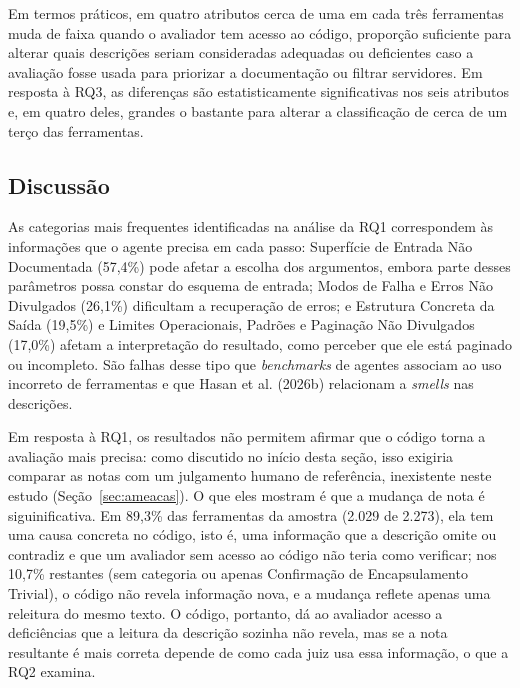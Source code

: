 Em termos práticos, em quatro atributos cerca de uma em cada três ferramentas muda de faixa quando o avaliador tem acesso ao código, proporção suficiente para alterar quais descrições seriam consideradas adequadas ou deficientes caso a avaliação fosse usada para priorizar a documentação ou filtrar servidores. Em resposta à RQ3, as diferenças são estatisticamente significativas nos seis atributos e, em quatro deles, grandes o bastante para alterar a classificação de cerca de um terço das ferramentas.

\subsection{Discussão}
\label{subsec:discussao}

As categorias mais frequentes identificadas na análise da RQ1 correspondem às informações que o agente precisa em cada passo: Superfície de Entrada Não Documentada (57,4\%) pode afetar a escolha dos argumentos, embora parte desses parâmetros possa constar do esquema de entrada; Modos de Falha e Erros Não Divulgados (26,1\%) dificultam a recuperação de erros; e Estrutura Concreta da Saída (19,5\%) e Limites Operacionais, Padrões e Paginação Não Divulgados (17,0\%) afetam a interpretação do resultado, como perceber que ele está paginado ou incompleto. São falhas desse tipo que \textit{benchmarks} de agentes associam ao uso incorreto de ferramentas \cite{2025arXiv250814704L} e que Hasan et al. (2026b)\nocite{2026arXiv260214878M} relacionam a \textit{smells} nas descrições.

Em resposta à RQ1, os resultados não permitem afirmar que o código torna a avaliação mais precisa: como discutido no início desta seção, isso exigiria comparar as notas com um julgamento humano de referência, inexistente neste estudo (Seção~\ref{sec:ameacas}). O que eles mostram é que a mudança de nota é siguinificativa. Em 89,3\% das ferramentas da amostra (2.029 de 2.273), ela tem uma causa concreta no código, isto é, uma informação que a descrição omite ou contradiz e que um avaliador sem acesso ao código não teria como verificar; nos 10,7\% restantes (sem categoria ou apenas Confirmação de Encapsulamento Trivial), o código não revela informação nova, e a mudança reflete apenas uma releitura do mesmo texto. O código, portanto, dá ao avaliador acesso a deficiências que a leitura da descrição sozinha não revela, mas se a nota resultante é mais correta depende de como cada juiz usa essa informação, o que a RQ2 examina.


